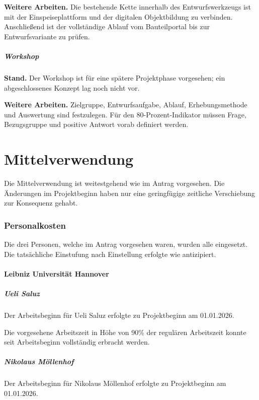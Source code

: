\documentclass[type=zwischenbericht]{zukunftbau}
\begin{document}
\textbf{Weitere Arbeiten.} Die bestehende Kette innerhalb des Entwurfswerkzeugs ist mit der Einspeiseplattform und der digitalen Objektbildung zu verbinden. Anschließend ist der vollständige Ablauf vom Bauteilportal bis zur Entwurfsvariante zu prüfen.

\subsubsection{Workshop}

\textbf{Stand.} Der Workshop ist für eine spätere Projektphase vorgesehen; ein abgeschlossenes Konzept lag noch nicht vor.

\textbf{Weitere Arbeiten.} Zielgruppe, Entwurfsaufgabe, Ablauf, Erhebungsmethode und Auswertung sind festzulegen. Für den 80-Prozent-Indikator müssen Frage, Bezugsgruppe und positive Antwort vorab definiert werden.

\part{Mittelverwendung}

Die Mittelverwendung ist weitestgehend wie im Antrag vorgesehen. Die Änderungen im Projektbeginn haben nur eine geringfügige zeitliche Verschiebung zur Konsequenz gehabt.

\section{Personalkosten}

Die drei Personen, welche im Antrag vorgesehen waren, wurden alle eingesetzt. Die tatsächliche Einstufung nach Einstellung erfolgte wie antizipiert.

\subsection{Leibniz Universität Hannover}

\subsubsection{Ueli Saluz}
Der Arbeitsbeginn für Ueli Saluz erfolgte zu Projektbeginn am 01.01.2026.

Die vorgesehene Arbeitszeit in Höhe von 90\% der regulären Arbeitszeit konnte seit Arbeitsbeginn vollständig erbracht werden.

\subsubsection{Nikolaus Möllenhof}
Der Arbeitsbeginn für Nikolaus Möllenhof erfolgte zu Projektbeginn am 01.01.2026.
\end{document}
